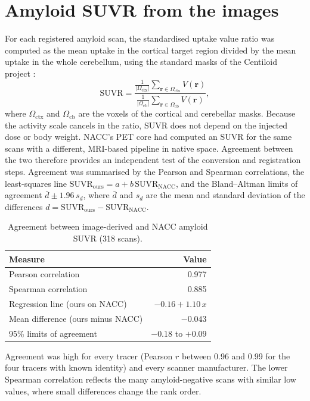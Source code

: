 \section{Amyloid SUVR from the images}

For each registered amyloid scan, the standardised uptake value ratio was computed as the mean uptake in the cortical target region divided by the mean uptake in the whole cerebellum, using the standard masks of the Centiloid project \cite{klunk2015}:
\begin{equation}
\text{SUVR} = \frac{\frac{1}{|\Omega_{\text{ctx}}|}\sum_{\mathbf{r} \in \Omega_{\text{ctx}}} V(\mathbf{r})}{\frac{1}{|\Omega_{\text{cb}}|}\sum_{\mathbf{r} \in \Omega_{\text{cb}}} V(\mathbf{r})},
\end{equation}
where $\Omega_{\text{ctx}}$ and $\Omega_{\text{cb}}$ are the voxels of the cortical and cerebellar masks. Because the activity scale cancels in the ratio, SUVR does not depend on the injected dose or body weight. NACC's PET core had computed an SUVR for the same scans with a different, MRI-based pipeline in native space. Agreement between the two therefore provides an independent test of the conversion and registration steps. Agreement was summarised by the Pearson and Spearman correlations, the least-squares line $\text{SUVR}_{\text{ours}} = a + b\,\text{SUVR}_{\text{NACC}}$, and the Bland--Altman limits of agreement $\bar{d} \pm 1.96\, s_d$, where $\bar{d}$ and $s_d$ are the mean and standard deviation of the differences $d = \text{SUVR}_{\text{ours}} - \text{SUVR}_{\text{NACC}}$.

\begin{table}[H]
\centering\small
\caption{Agreement between image-derived and NACC amyloid SUVR (318 scans).}
\label{tab:suvr}
\begin{tabular}{@{}lr@{}}
\toprule
Measure & Value \\
\midrule
Pearson correlation & 0.977 \\
Spearman correlation & 0.885 \\
Regression line (ours on NACC) & $-0.16 + 1.10\,x$ \\
Mean difference (ours minus NACC) & $-0.043$ \\
95\% limits of agreement & $-0.18$ to $+0.09$ \\
\bottomrule
\end{tabular}
\end{table}

Agreement was high for every tracer (Pearson $r$ between 0.96 and 0.99 for the four tracers with known identity) and every scanner manufacturer. The lower Spearman correlation reflects the many amyloid-negative scans with similar low values, where small differences change the rank order.

